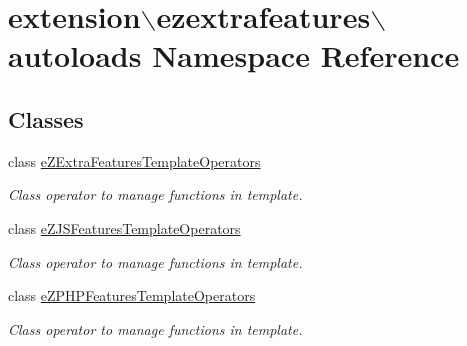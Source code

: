 \hypertarget{namespaceextension_1_1ezextrafeatures_1_1autoloads}{\section{extension$\backslash$ezextrafeatures$\backslash$autoloads Namespace Reference}
\label{namespaceextension_1_1ezextrafeatures_1_1autoloads}
}
\subsection*{Classes}
\begin{DoxyCompactItemize}
\item 
class \hyperlink{classextension_1_1ezextrafeatures_1_1autoloads_1_1e_z_extra_features_template_operators}{e\-Z\-Extra\-Features\-Template\-Operators}
\begin{DoxyCompactList}\small\item\em Class operator to manage functions in template. \end{DoxyCompactList}\item 
class \hyperlink{classextension_1_1ezextrafeatures_1_1autoloads_1_1e_z_j_s_features_template_operators}{e\-Z\-J\-S\-Features\-Template\-Operators}
\begin{DoxyCompactList}\small\item\em Class operator to manage functions in template. \end{DoxyCompactList}\item 
class \hyperlink{classextension_1_1ezextrafeatures_1_1autoloads_1_1e_z_p_h_p_features_template_operators}{e\-Z\-P\-H\-P\-Features\-Template\-Operators}
\begin{DoxyCompactList}\small\item\em Class operator to manage functions in template. \end{DoxyCompactList}\end{DoxyCompactItemize}
